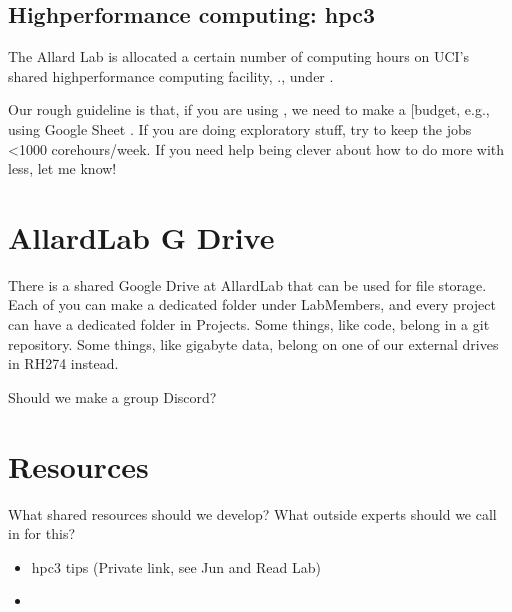 \documentclass[letterpaper,10pt,english]{sphinxmanual}
\begin{document}
\subsection{High\sphinxhyphen{}performance computing: hpc3}
\label{\detokenize{05Group:high-performance-computing-hpc3}}
\sphinxAtStartPar
The Allard Lab is allocated a certain number of computing hours on UCI’s shared high\sphinxhyphen{}performance computing facility, ., under .

\sphinxAtStartPar
Our rough guideline is that, if you are using , we need to make a {[}budget, e.g., using Google Sheet . If you are doing exploratory stuff, try to keep the jobs \textless{}1000 core\sphinxhyphen{}hours/week. If you need help being clever about how to do more with less, let me know!


\section{AllardLab G Drive}
\label{\detokenize{05Group:allardlab-g-drive}}
\sphinxAtStartPar
There is a shared Google Drive at AllardLab that can be used for file storage. Each of you can make a dedicated folder under LabMembers, and every project can have a dedicated folder in Projects. Some things, like code, belong in a git repository. Some things, like gigabyte data, belong on one of our external drives in RH274 instead.

\sphinxAtStartPar
Should we make a group Discord?


\section{Resources}
\label{\detokenize{05Group:resources}}
\sphinxAtStartPar
What shared resources should we develop? What outside experts should we call in for this?
\begin{itemize}
\item {} 
\sphinxAtStartPar
hpc3 tips (Private link, see Jun and Read Lab)

\item {} 
\sphinxAtStartPar
{}

\end{itemize}
\end{document}
